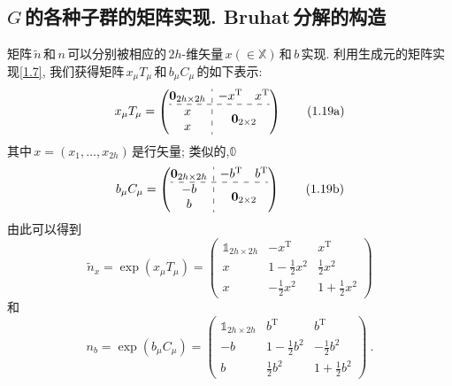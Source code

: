 \subsection{$G\,$的各种子群的矩阵实现. Bruhat\,分解的构造}

矩阵$\,\tilde{n}\,$和$\,n\,$可以分别被相应的\,$2h$-维矢量$\,x(\in \mathbb{X})\,$和$\,b\,$实现. 
利用生成元的矩阵实现\eqref{1.7}, 我们获得矩阵$\,x_{\mu}T_{\mu}\,$和$\,b_{\mu}C_{\mu}\,$的如下表示:
\begin{equation}
    x_{\mu}T_{\mu}= \left(
        \begin{array}{@{}c:c@{}}
            \mathbf{0}_{2h\times 2h} & \begin{matrix}
                -x^{\mathrm{T}} & x^{\mathrm{T}} 
            \end{matrix} \\ \hdashline[4pt/4pt]
            \begin{matrix}
                x \\ x
            \end{matrix} &
            \mathbf{0}_{2\times 2}
        \end{array}
    \right) \tag{1.19a} \label{1.19a}
\end{equation}
其中$\,x=(x_{1},\ldots,x_{2h})\,$是行矢量; 类似的,$\mathds{0}$
\begin{equation}
    b_{\mu}C_{\mu}= \left(
        \begin{array}{@{}c:c@{}}
            \mathbf{0}_{2h\times 2h} & \begin{matrix}
                -b^{\mathrm{T}} & b^{\mathrm{T}} 
            \end{matrix} \\ \hdashline[4pt/4pt]
            \begin{matrix}
                -b \\ b
            \end{matrix} &
            \mathbf{0}_{2\times 2} 
        \end{array}
    \right) \tag{1.19b} \label{1.19b}
\end{equation}
由此可以得到
\begin{equation}
    \tilde{n}_{x}=\exp(x_{\mu}T_{\mu}) =
    \begin{pmatrix}
        \mathds{1}_{2h\times 2h} & -x^{\mathrm{T}} &  x^{\mathrm{T}} \\
        x  & 1-\tfrac{1}{2}x^{2} & \tfrac{1}{2}x^{2} \\
        x & -\tfrac{1}{2}x^{2} & 1+\tfrac{1}{2}x^{2}
    \end{pmatrix}  \tag{1.20a} \label{1.20a}
\end{equation}
和
\begin{equation}
    n_{b}=\exp(b_{\mu}C_{\mu}) =
    \begin{pmatrix}
        \mathds{1}_{2h\times 2h} & b^{\mathrm{T}} &  b^{\mathrm{T}} \\
        -b  & 1-\tfrac{1}{2}b^{2} & -\tfrac{1}{2}b^{2} \\
        b & \tfrac{1}{2}b^{2} & 1+\tfrac{1}{2}b^{2}
    \end{pmatrix}  \tag{1.20b} \label{1.20b} \:.
\end{equation}
\setcounter{equation}{20}

